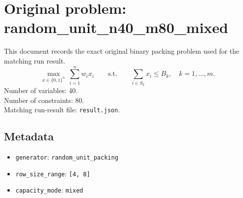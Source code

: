 \documentclass[11pt]{article}
\begin{document}
\section*{Original problem: random\_unit\_n40\_m80\_mixed}
This document records the exact original binary packing problem used for the matching run result.
\[
\max_{x\in\{0,1\}^n}\ \sum_{i=1}^n w_i x_i
\qquad\text{s.t.}\qquad
\sum_{i\in S_k} x_i \le B_k,\quad k=1,\dots,m.
\]
Number of variables: 40.\\
Number of constraints: 80.\\
Matching run-result file: \texttt{result.json}.
\subsection*{Metadata}
\begin{itemize}
\item \texttt{generator}: \texttt{random\_unit\_packing}
\item \texttt{row\_size\_range}: \texttt{[4, 8]}
\item \texttt{capacity\_mode}: \texttt{mixed}
\end{itemize}
\end{document}
